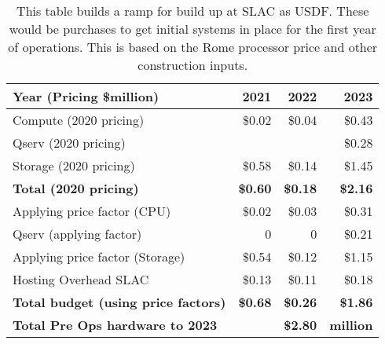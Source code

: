 \tiny \begin{longtable} {|l |r  |r  |r |} \caption{This table builds a ramp for build up at SLAC as USDF. These would be purchases to get initial systems in place for the first year of operations. This is based on the Rome processor price and other construction inputs. \label{tab:preOps}}\\ 
\hline 
\textbf{Year (Pricing \$million)}&\textbf{2021}&\textbf{2022}&\textbf{2023} \\ \hline
{Compute (2020 pricing)}&{\$0.02}&{\$0.04}&{\$0.43} \\ \hline
{Qserv (2020 pricing)}&{}&{}&{\$0.28} \\ \hline
{Storage (2020 pricing)}&{\$0.58}&{\$0.14}&{\$1.45} \\ \hline
\textbf{Total (2020 pricing)}&\textbf{\$0.60}&\textbf{\$0.18}&\textbf{\$2.16} \\ \hline
{Applying price factor (CPU)}&{\$0.02}&{\$0.03}&{\$0.31} \\ \hline
{Qserv (applying factor)}&{0}&{0}&{\$0.21} \\ \hline
{Applying price factor (Storage)}&{\$0.54}&{\$0.12}&{\$1.15} \\ \hline
{Hosting Overhead SLAC}&{\$0.13}&{\$0.11}&{\$0.18} \\ \hline
\textbf{Total budget (using price factors)}&\textbf{\$0.68}&\textbf{\$0.26}&\textbf{\$1.86} \\ \hline
\textbf{Total Pre Ops hardware to 2023}&\textbf{}&\textbf{\$2.80}&\textbf{million} \\ \hline
\end{longtable} \normalsize
